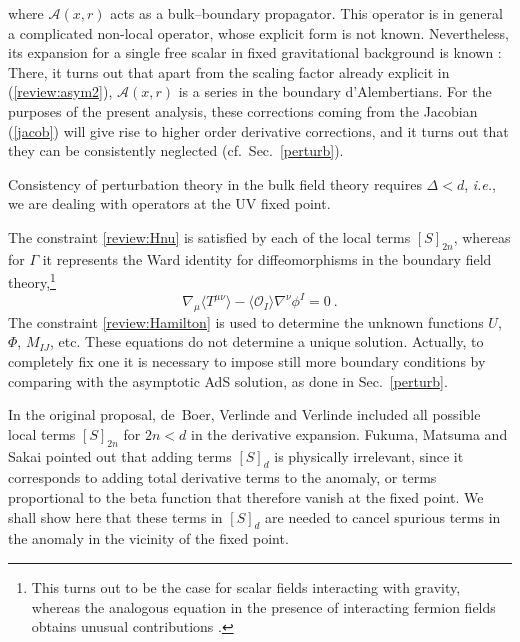 \documentclass[a4paper,12pt]{article}
\begin{document}
where $\mathcal{A}(x,r)$ acts as a bulk--boundary propagator. 
This operator is in general a complicated non-local operator, 
whose explicit form is not known. Nevertheless, its expansion for 
a single free scalar in fixed gravitational background is known 
\cite{deHaro00a}:
There, it turns out that apart from the scaling factor already explicit in 
(\ref{review:asym2}), $\mathcal{A}(x,r)$ is a 
series in the boundary d'Alembertians.
For the purposes of the present analysis, these corrections coming 
from the Jacobian (\ref{jacob}) will give rise to 
higher order derivative corrections, and it turns out that they can be 
consistently neglected (cf.~Sec.~\ref{perturb}).

Consistency of perturbation theory in the bulk field theory requires
$\Delta<d$, \emph{i.e.}, we are dealing with operators at the UV fixed
point. 


The constraint \eqref{review:Hnu} is satisfied by each of the local
terms $[S]_{2n}$, whereas for $\Gamma$ it represents the Ward identity
for diffeomorphisms in the boundary field theory,\footnote{This turns out to 
be the case for scalar fields interacting with gravity, whereas the analogous
equation in the presence of interacting fermion fields obtains unusual
contributions \cite{Kalkkinen00}.}
\begin{equation}
\label{review:Ward}
  \nabla_\mu \langle T^{\mu\nu}\rangle - \langle \mathcal{O}_I \rangle
  \nabla^\nu \phi^I =0~.
\end{equation}
The constraint \eqref{review:Hamilton} is used to determine the
unknown functions $U$, $\Phi$, $M_{IJ}$, etc. These equations do not 
determine a unique solution. 
Actually, to completely fix one 
it is necessary to impose still more boundary conditions 
by comparing with the asymptotic AdS solution, as done in Sec.~\ref{perturb}. 



In the original proposal, de~Boer, Verlinde and Verlinde included all
possible local terms $[S]_{2n}$ for $2n<d$ in the derivative
expansion. Fukuma, Matsuma and Sakai \cite{Fukuma00a} pointed out that
adding terms $[S]_d$ is physically irrelevant, since
it corresponds to adding total derivative terms to the anomaly, or terms
proportional to the beta function that therefore vanish at the fixed point. 
We shall show here that these terms in 
$[S]_d$ are needed to cancel spurious terms in the anomaly in the 
vicinity of the fixed point. 
\end{document}
